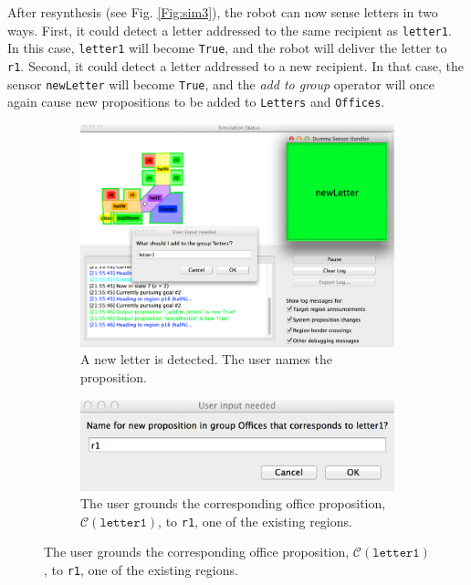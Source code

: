 After resynthesis (see Fig. \ref{Fig:sim3}), the robot can now sense letters in two ways. First, it could detect a letter addressed to the same recipient as \texttt{letter1}. In this case, \texttt{letter1} will become \texttt{True}, and the robot will deliver the letter to \texttt{r1}. Second, it could detect a letter addressed to a new recipient. In that case, the sensor \texttt{newLetter} will become \texttt{True}, and the \emph{add to group} operator will once again cause new propositions to be added to \texttt{Letters} and \texttt{Offices}.

\begin{figure}[h]
	\centering
	\begin{subfigure}[b]{0.99\columnwidth}
	\includegraphics[width=0.99\columnwidth, clip]{./img/sim1.jpg}
	\caption{A new letter is detected. The user names the proposition.} 
	\label{Fig:sim1}
	\end{subfigure}
	
	\vspace{4 pt}
	\begin{subfigure}[b]{0.99\columnwidth}
	\includegraphics[width=0.99\columnwidth, clip]{./img/sim2.jpg}
	\caption{The user grounds the corresponding office proposition, $\mathcal{C}(\texttt{letter1})$, to \texttt{r1}, one of the existing regions.} 
	\label{Fig:sim2}
	\end{subfigure}
	

\end{figure}
